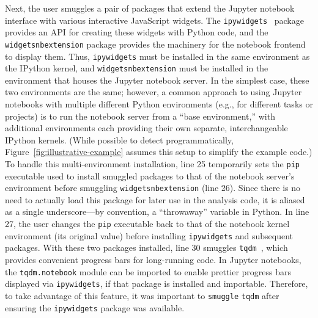 \documentclass[preprint,12pt,a4paper]{elsarticle}
\begin{document}
Next, the user smuggles a pair of packages that extend the Jupyter notebook interface with various interactive JavaScript widgets. The \texttt{ipywidgets}~\cite{GrouEtal15} package provides an API for creating these widgets with Python code, and the \texttt{widgetsnbextension} package provides the machinery for the notebook frontend to display them. Thus, \texttt{ipywidgets} must be installed in the same environment as the IPython kernel, and \texttt{widgetsnbextension} must be installed in the environment that houses the Jupyter notebook server. In the simplest case, these two environments are the same; however, a common approach to using Jupyter notebooks with multiple different Python environments (e.g., for different tasks or projects) is to run the notebook server from a ``base environment,'' with additional environments each providing their own separate, interchangeable IPython kernels. (While possible to detect programmatically, Figure~\ref{fig:illustrative-example} assumes this setup to simplify the example code.) To handle this multi-environment installation, line 25 temporarily sets the \texttt{pip} executable used to install smuggled packages to that of the notebook server's environment before smuggling \texttt{widgetsnbextension} (line 26). Since there is no need to actually load this package for later use in the analysis code, it is aliased as a single underscore---by convention, a ``throwaway'' variable in Python. In line 27, the user changes the \texttt{pip} executable back to that of the notebook kernel environment (its original value) before installing \texttt{ipywidgets} and subsequent packages. With these two packages installed, line 30 smuggles \texttt{tqdm}~\cite{CaspEtal22}, which provides convenient progress bars for long-running code. In Jupyter notebooks, the \texttt{tqdm.notebook} module can be imported to enable prettier progress bars displayed via \texttt{ipywidgets}, if that package is installed and importable. Therefore, to take advantage of this feature, it was important to \texttt{smuggle} \texttt{tqdm} after ensuring the \texttt{ipywidgets} package was available.
\end{document}
